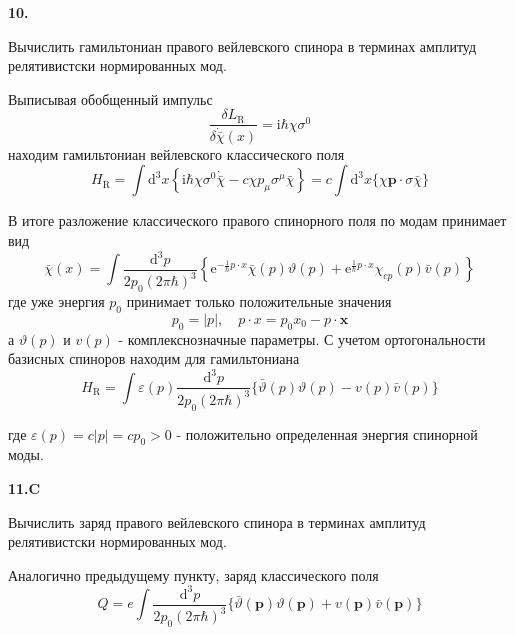 \documentclass[a4paper,12pt]{article} %
\begin{document}
\begin{ttask} \textbf{10.}
	
	 
Вычислить гамильтониан правого вейлевского спинора в терминах амплитуд релятивистски нормированных мод. 



Выписывая обобщенный импульс
$$
\frac{\delta L_{\mathrm{R}}}{\delta \dot{\bar{\chi}}(x)}=\mathrm{i} \hbar \chi \sigma^{0}
$$
находим гамильтониан вейлевского классического поля
$$
H_{\mathrm{R}}=\int \mathrm{d}^{3} x\left\{\mathrm{i} \hbar \chi \sigma^{0} \dot{\bar{\chi}}-c \chi p_{\mu} \sigma^{\mu} \bar{\chi}\right\}=c \int \mathrm{d}^{3} x\{\chi \boldsymbol{p} \cdot \sigma \bar{\chi}\}
$$

В итоге разложение классического правого спинорного поля по модам
принимает вид
$$
\bar{\chi}(x)=\int \frac{\mathrm{d}^{3} p}{2 p_{0}(2 \pi \hbar)^{3}}\left\{\mathrm{e}^{-\frac{1}{\hbar} p \cdot x} \bar{\chi}(p) \vartheta(p)+\mathrm{e}^{\frac{1}{\hbar} p \cdot x} \chi_{c p}(p) \bar{v}(p)\right\}
$$
где уже энергия $p_{0}$ принимает только положительные значения
$$
p_{0}=|p|, \quad p \cdot x=p_{0} x_{0}-p \cdot \boldsymbol{x}
$$
а $\vartheta(p)$ и $v(p)$ - комплекснозначные параметры.
С учетом ортогональности базисных спиноров находим для гамильтониана
$$
H_{\mathrm{R}}=\int \varepsilon(p) \frac{\mathrm{d}^{3} p}{2 p_{0}(2 \pi \hbar)^{3}}\{\bar{\vartheta}(p) \vartheta(p)-v(p) \bar{v}(p)\}
$$

где $\varepsilon(p)=c|p|=c p_{0}>0$ - положительно определенная энергия спинорной моды. 








\end{ttask}



\begin{ttask}\textbf{11.C}

Вычислить заряд правого вейлевского спинора в терминах амплитуд релятивистски нормированных мод.




Аналогично предыдущему пункту, заряд классического поля
$$
Q=e \int \frac{\mathrm{d}^{3} p}{2 p_{0}(2 \pi \hbar)^{3}}\{\bar{\vartheta}(\boldsymbol{p}) \vartheta(\boldsymbol{p})+v(\boldsymbol{p}) \bar{v}(\boldsymbol{p})\}
$$


\end{ttask}
\end{document}
